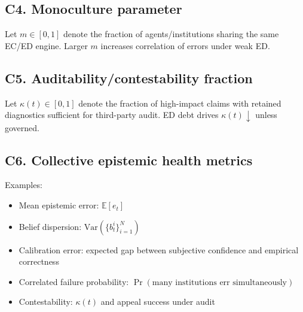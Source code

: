 \subsection*{C4. Monoculture parameter}
Let $m\in[0,1]$ denote the fraction of agents/institutions sharing the same EC/ED engine. Larger $m$ increases correlation of errors under weak ED.

\subsection*{C5. Auditability/contestability fraction}
Let $\kappa(t)\in[0,1]$ denote the fraction of high-impact claims with retained diagnostics sufficient for third-party audit. ED debt drives $\kappa(t)\downarrow$ unless governed.

\subsection*{C6. Collective epistemic health metrics}
Examples:
\begin{itemize}[leftmargin=*]
  \item Mean epistemic error: $\mathbb{E}[e_t]$
  \item Belief dispersion: $\mathrm{Var}(\{b^i_t\}_{i=1}^N)$
  \item Calibration error: expected gap between subjective confidence and empirical correctness
  \item Correlated failure probability: $\Pr(\text{many institutions err simultaneously})$
  \item Contestability: $\kappa(t)$ and appeal success under audit
\end{itemize}
